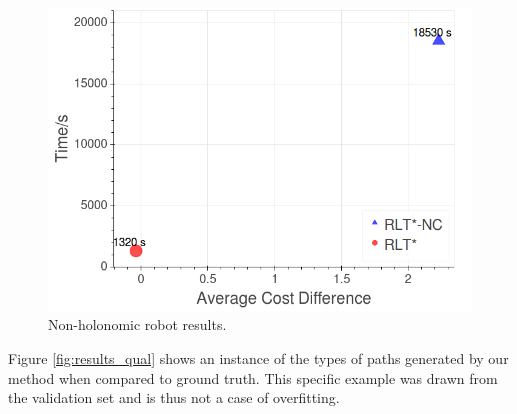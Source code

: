 \documentclass[a4paper,11pt]{report}
\begin{document}
  	\begin{figure}[tbh]
	\centering
	\captionsetup[subfigure]{justification=centering}
	\hspace{-1cm}
    \includegraphics[scale=0.4]{figures/pareto_front_kino.png}

    \caption{Non-holonomic robot results.}
    \vspace{-2mm}
  \label{fig:results_kino}
  \end{figure}

Figure \ref{fig:results_qual} shows an instance of the types of paths generated by our method when compared to ground truth. This specific example was drawn from the validation set and is thus not a case of overfitting.
\end{document}
